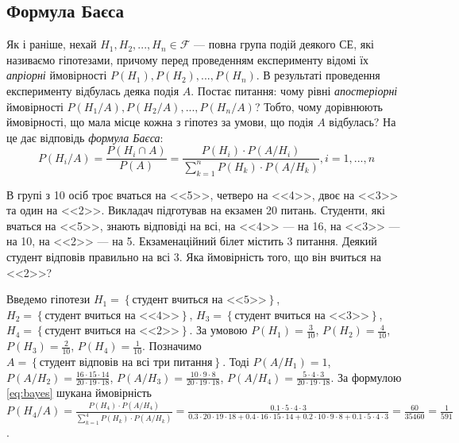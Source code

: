 \subsection{Формула Баєса}
Як і раніше, нехай $H_1, H_2, ..., H_n \in \mathcal{F}$ --- повна група подій деякого СЕ, які називаємо гіпотезами, причому
перед проведенням експерименту відомі їх \emph{апріорні} ймовірності $P(H_1), P(H_2), ..., P(H_n)$.
В результаті проведення експерименту відбулась деяка подія $A$.
Постає питання: чому рівні \emph{апостеріорні} ймовірності $P(H_1/A), P(H_2/A), ..., P(H_n/A)$?
Тобто, чому дорівнюють ймовірності, що мала місце кожна з гіпотез за умови, що подія $A$ відбулась? На це дає відповідь \emph{формула Баєса}:
\begin{equation}\label{eq:bayes}
    P(H_i/A) = \frac{P(H_i \cap A)}{P(A)} = \frac{P(H_i) \cdot P(A/H_i)}{\sum_{k=1}^n P(H_k)\cdot P(A/H_k)}, i = 1,...,n
\end{equation}

\begin{example}
    В групі з 10 осіб троє вчаться на <<5>>, четверо на <<4>>, двоє на <<3>> та один на <<2>>.
    Викладач підготував на екзамен 20 питань. Студенти, які вчаться на <<5>>, знають відповіді на всі,
    на <<4>> --- на 16, на <<3>> --- на 10, на <<2>> --- на 5.
    Екзаменаційний білет містить 3 питання. Деякий студент відповів правильно на всі 3.
    Яка ймовірність того, що він вчиться на <<2>>?

    Введемо гіпотези $H_1 = \left\{ \text{студент вчиться на <<5>>}\right\}$, $H_2 = \left\{ \text{студент вчиться на <<4>>}\right\}$,
    $H_3 = \left\{ \text{студент вчиться на <<3>>}\right\}$, $H_4 = \left\{ \text{студент вчиться на <<2>>}\right\}$.
    За умовою $P(H_1) = \frac{3}{10}$, $P(H_2) = \frac{4}{10}$, $P(H_3) = \frac{2}{10}$, $P(H_4) = \frac{1}{10}$. 
    Позначимо $A = \left\{ \text{студент відповів на всі три питання}\right\}$. 
    Тоді $P(A/H_1) = 1$, $P(A/H_2) = \frac{16 \cdot 15 \cdot 14}{20 \cdot 19 \cdot 18}$, 
    $P(A/H_3) = \frac{10 \cdot 9 \cdot 8}{20 \cdot 19 \cdot 18}$, 
    $P(A/H_4) = \frac{5 \cdot 4 \cdot 3}{20 \cdot 19 \cdot 18}$.
    За формулою \eqref{eq:bayes} шукана ймовірність $P(H_4/A) = \frac{P(H_4) \cdot P(A/H_4)}{\sum_{k=1}^4 P(H_k)\cdot P(A/H_k)} =
    \frac{0.1 \cdot 5 \cdot 4 \cdot 3}{0.3 \cdot 20 \cdot 19 \cdot 18 + 0.4 \cdot 16 \cdot 15 \cdot 14 + 0.2 \cdot 10 \cdot 9 \cdot 8 + 0.1 \cdot 5 \cdot 4 \cdot 3}
     = \frac{60}{35460} = \frac{1}{591}$.

\end{example}